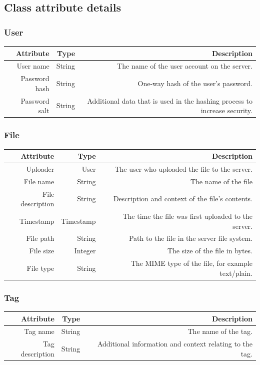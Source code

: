 \documentclass[10pt,a4paper]{article}
\begin{document}
\subsection{Class attribute details}
\subsubsection{User}
\begin{tabularx}{\textwidth}{|R|R|R|} \hline
\textbf{Attribute} & \textbf{Type} & \textbf{Description}\\ \hline
User name & String & The name of the user account on the server.\\ \hline
Password hash & String & One-way hash of the user's password.\\ \hline
Password salt & String & Additional data that is used in the hashing process to increase security.\\ \hline
\end{tabularx}

\subsubsection{File}
\begin{tabularx}{\textwidth}{|R|R|R|} \hline
\textbf{Attribute} & \textbf{Type} & \textbf{Description}\\ \hline
Uploader & User & The user who uploaded the file to the server.\\ \hline
File name & String & The name of the file\\ \hline
File description & String & Description and context of the file's contents.\\ \hline
Timestamp & Timestamp & The time the file was first uploaded to the server.\\ \hline
File path & String & Path to the file in the server file system.\\ \hline
File size & Integer & The size of the file in bytes.\\ \hline
File type & String & The MIME type of the file, for example text/plain.\\ \hline
\end{tabularx}

\subsubsection{Tag}
\begin{tabularx}{\textwidth}{|R|R|R|} \hline
\textbf{Attribute} & \textbf{Type} & \textbf{Description}\\ \hline
Tag name & String & The name of the tag.\\ \hline
Tag description & String & Additional information and context relating to the tag.\\ \hline
\end{tabularx}
\end{document}
